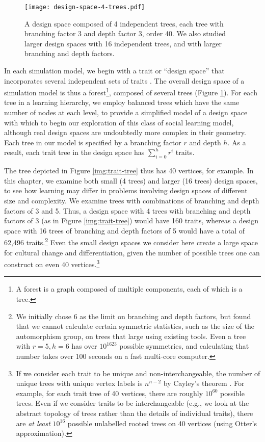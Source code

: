 \documentclass[graybox,natbib]{svmult}
\begin{document}
\begin{figure}[h] 
\centering 
\texttt{[image: design-space-4-trees.pdf]} 
\caption{A design space composed of 4 independent trees, each tree with branching factor 3 and depth factor 3, order 40.  We also studied larger design spaces with 16 independent trees, and with larger branching and depth factors.} 
\label{img:design-space-4} 
\end{figure}

In each simulation model, we begin with a trait or ``design space'' that
incorporates several independent sets of traits \citep{o2010cultural}.
The overall design space of a simulation model is thus a
forest\footnote{A forest is a graph composed of multiple components,
  each of which is a tree.}, composed of several trees (Figure
\ref{img:design-space-4}). For each tree in a learning hierarchy, we
employ balanced trees which have the same number of nodes at each level,
to provide a simplified model of a design space with which to begin our
exploration of this class of social learning model, although real design
spaces are undoubtedly more complex in their geometry. Each tree in our
model is specified by a branching factor $r$ and depth $h$. As a result,
each trait tree in the design space has $\sum_{i=0}^{h} r^i$ traits.

The tree depicted in Figure \ref{img:trait-tree} thus has 40 vertices,
for example. In this chapter, we examine both small (4 trees) and larger
(16 trees) design spaces, to see how learning may differ in problems
involving design spaces of different size and complexity. We examine
trees with combinations of branching and depth factors of 3 and 5. Thus,
a design space with 4 trees with branching and depth factors of 3 (as in
Figure \ref{img:trait-tree}) would have 160 traits, whereas a design
space with 16 trees of branching and depth factors of 5 would have a
total of 62,496 traits.\footnote{We initially chose 6 as the limit on
  branching and depth factors, but found that we cannot calculate
  certain symmetric statistics, such as the size of the automorphism
  group, on trees that large using existing tools. Even a tree with
  $r=5, h=6$ has over $10^{1623}$ possible symmetries, and calculating
  that number takes over 100 seconds on a fast multi-core computer.}
Even the small design spaces we consider here create a large space for
cultural change and differentiation, given the number of possible trees
one can construct on even 40 vertices.\footnote{If we consider each
  trait to be unique and non-interchangeable, the number of unique trees
  with unique vertex labels is $n^{n-2}$ by Cayley's theorem
  \citep{diestel2010graph}. For example, for each trait tree of 40
  vertices, there are roughly $10^{60}$ possible trees. Even if we
  consider traits to be interchangeable (e.g., we look at the abstract
  topology of trees rather than the details of individual traits), there
  are \emph{at least} $10^{16}$ possible unlabelled rooted trees on 40
  vertices (using Otter's \citeyearpar{otter1948number} approximation).}
\end{document}
